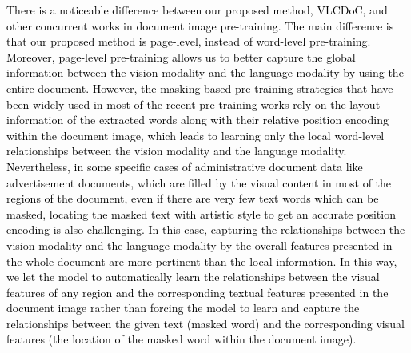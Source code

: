 \documentclass[preprint,review,12pt]{elsarticle}
\begin{document}
\textcolor{black}{There is a noticeable difference between our proposed method, VLCDoC, and other concurrent works in document image pre-training. The main difference is that our proposed method is page-level, instead of word-level pre-training. Moreover, page-level pre-training allows us to better capture the global information between the vision modality and the language modality by using the entire document. However, the masking-based pre-training strategies that have been widely used in most of the recent pre-training works rely on the layout information of the extracted words along with their relative position encoding within the document image, which leads to learning only the local word-level relationships between the vision modality and the language modality. Nevertheless, in some specific cases of administrative document data like advertisement documents, which are filled by the visual content in most of the regions of the document, even if there are very few text words which can be masked, locating the masked text with artistic style to get an accurate position encoding is also challenging. In this case, capturing the relationships between the vision modality and the language modality by the overall features presented in the whole document are more pertinent than the local information. In this way, we let the model to automatically learn the relationships between the visual features of any region and the corresponding textual features presented in the document image rather than forcing the model to learn and capture the relationships between the given text (masked word) and the corresponding visual features (the location of the masked word within the document image).} 
\end{document}
